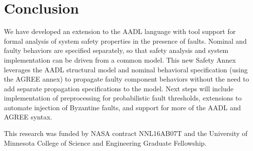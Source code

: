 \section{Conclusion}

We have developed an extension to the AADL language with tool support for formal analysis of system safety properties in the presence of faults. Nominal and faulty behaviors are specified separately, so that safety analysis and system implementation can be driven from a common model. This new Safety Annex leverages the AADL structural model and nominal behavioral specification (using the AGREE annex) to propagate faulty component behaviors without the need to add separate propagation specifications to the model.   Next steps will include implementation of preprocessing for probabilistic fault thresholds, extensions to automate injection of Byzantine faults, and support for more of the AADL and AGREE syntax.  

 This research was funded by NASA contract NNL16AB07T and the University of Minnesota College of Science and Engineering Graduate Fellowship.


